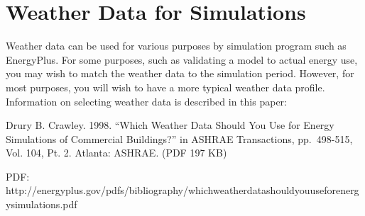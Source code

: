 \section{Weather Data for Simulations}\label{weather-data-for-simulations}

Weather data can be used for various purposes by simulation program such as EnergyPlus. For some purposes, such as validating a model to actual energy use, you may wish to match the weather data to the simulation period. However, for most purposes, you will wish to have a more typical weather data profile. Information on selecting weather data is described in this paper:

Drury B. Crawley. 1998. ``Which Weather Data Should You Use for Energy Simulations of Commercial Buildings?'' in ASHRAE Transactions, pp.~498-515, Vol. 104, Pt. 2. Atlanta: ASHRAE. (PDF 197 KB)

PDF: http://energyplus.gov/pdfs/bibliography/whichweatherdatashouldyouuseforenergysimulations.pdf
